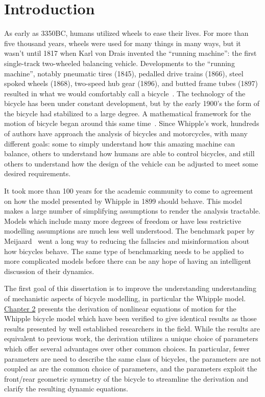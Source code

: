 \chapter{Introduction} \label{chapter1}
As early as 3350BC, humans utilized wheels to ease their lives. For more than
five thousand years, wheels were used for many things in many ways, but it
wasn't until 1817 when Karl von Drais invented the ``running machine'': the
first single-track two-wheeled balancing vehicle. Developments to the ``running
machine'', notably pneumatic tires (1845), pedalled drive trains (1866), steel
spoked wheels (1868), two-speed hub gear (1896), and butted frame tubes (1897)
resulted in what we would comfortably call a bicycle~\cite{Wilson2004}. The
technology of the bicycle has been under constant development, but by the early
1900's the form of the bicycle had stabilized to a large degree. A mathematical
framework for the motion of bicycle began around this same
time~\cite{Whipple1899}. Since Whipple's work, hundreds of authors have approach
the analysis of bicycles and motorcycles, with many different goals: some to
simply understand how this amazing machine can balance, others to understand
how humans are able to control bicycles, and still others to understand how the
design of the vehicle can be adjusted to meet some desired requirements.

It took more than 100 years for the academic community to come to agreement on
how the model presented by Whipple in 1899 should behave. This model makes a
large number of simplifying assumptions to render the analysis tractable.
Models which include many more degrees of freedom or have less restrictive
modelling assumptions are much less well understood. The benchmark paper by
Meijaard~\cite{Meijaard2007} went a long way to reducing the fallacies and
misinformation about how bicycles behave. The same type of benchmarking needs
to be applied to more complicated models before there can be any hope of having
an intelligent discussion of their dynamics.

The first goal of this dissertation is to improve the understanding
understanding of mechanistic aspects of bicycle modelling, in particular the
Whipple model. \hyperref[chapter2]{Chapter 2} presents the derivation of nonlinear
equations of motion for the Whipple bicycle model which have been verified to
give identical results as those results presented by well established
researchers in the field. While the results are equivalent to previous work,
the derivation utilizes a unique choice of parameters which offer several
advantages over other common choices.  In particular, fewer parameters are need
to describe the same class of bicycles, the parameters are not coupled as are
the common choice of parameters, and the parameters exploit the front/rear
geometric symmetry of the bicycle to streamline the derivation and clarify the
resulting dynamic equations.

